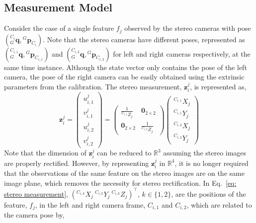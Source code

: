 \subsection{Measurement Model}
\label{subsec: measurement model}
Consider the case of a single feature $f_j$ observed by the stereo cameras with pose $\left({}^{C_i}_G\mathbf{q}, {}^G\mathbf{p}_{C_i}\right)$. Note that the stereo cameras have different poses, represented as $\left({}^{C_{i,1}}_G\mathbf{q}, {}^G\mathbf{p}_{C_{i,1}}\right)$ and $\left({}^{C_{i,2}}_G\mathbf{q}, {}^G\mathbf{p}_{C_{i,2}}\right)$ for left and right cameras respectively, at the same time instance. Although the state vector only contains the pose of the left camera, the pose of the right camera can be easily obtained using the extrinsic parameters from the calibration. The stereo measurement, $\mathbf{z}_i^j$, is represented as,
\begin{equation}
\mathbf{z}_i^j = 
\begin{pmatrix}
u_{i, 1}^j \\ v_{i, 1}^j \\ 
u_{i, 2}^j \\ v_{i, 2}^j
\end{pmatrix} 
= 
\begin{pmatrix}
\frac{1}{{}^{C_{i, 1}}Z_j} & \mathbf{0}_{2\times 2} \\
\mathbf{0}_{2\times 2} & \frac{1}{{}^{C_{i, 2}}Z_j}
\end{pmatrix}
\begin{pmatrix}
{}^{C_{i, 1}}X_j \\ {}^{C_{i, 1}}Y_j \\
{}^{C_{i, 2}}X_j \\ {}^{C_{i, 2}}Y_j
\end{pmatrix}
\label{eq: stereo measurement}
\end{equation}
Note that the dimension of $\mathbf{z}_i^j$ can be reduced to $\mathbb{R}^3$ assuming the stereo images are properly rectified. However, by representing $\mathbf{z}_i^j$ in $\mathbb{R}^4$, it is no longer required that the observations of the same feature on the stereo images are on the same image plane, which removes the necessity for stereo rectification. In Eq.~\eqref{eq: stereo measurement}, $\left({}^{C_{i, k}}X_j\  {}^{C_{i, k}}Y_j\  {}^{C_{i, k}}Z_j \right)^\top$, $k\in\{1, 2\}$, are the positions of the feature, $f_j$, in the left and right camera frame, $C_{i, 1}$ and $C_{i, 2}$, which are related to the camera pose by,
